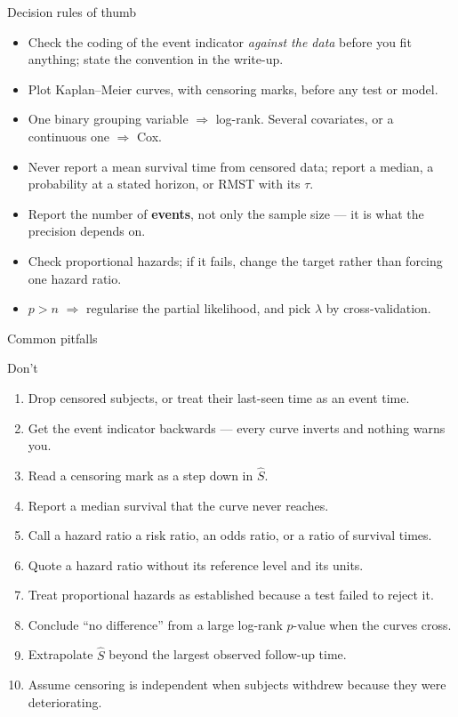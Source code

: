 \documentclass[aspectratio=169,11pt]{beamer}
\begin{document}
\begin{frame}{Decision rules of thumb}
  \begin{itemize}
    \item Check the coding of the event indicator \emph{against the data} before you
          fit anything; state the convention in the write-up.
    \item Plot Kaplan--Meier curves, with censoring marks, before any test or model.
    \item One binary grouping variable $\Rightarrow$ log-rank. Several covariates, or
          a continuous one $\Rightarrow$ Cox.
    \item Never report a mean survival time from censored data; report a median, a
          probability at a stated horizon, or RMST with its $\tau$.
    \item Report the number of \textbf{events}, not only the sample size --- it is what
          the precision depends on.
    \item Check proportional hazards; if it fails, change the target rather than
          forcing one hazard ratio.
    \item $p>n$ $\Rightarrow$ regularise the partial likelihood, and pick $\lambda$ by
          cross-validation.
  \end{itemize}
\end{frame}

\begin{frame}{Common pitfalls}
  \begin{alertblock}{Don't}
    \begin{enumerate}
      \item Drop censored subjects, or treat their last-seen time as an event time.
      \item Get the event indicator backwards --- every curve inverts and nothing warns you.
      \item Read a censoring mark as a step down in $\hat S$.
      \item Report a median survival that the curve never reaches.
      \item Call a hazard ratio a risk ratio, an odds ratio, or a ratio of survival times.
      \item Quote a hazard ratio without its reference level and its units.
      \item Treat proportional hazards as established because a test failed to reject it.
      \item Conclude ``no difference'' from a large log-rank $p$-value when the curves cross.
      \item Extrapolate $\hat S$ beyond the largest observed follow-up time.
      \item Assume censoring is independent when subjects withdrew because they were
            deteriorating.
    \end{enumerate}
  \end{alertblock}
\end{frame}
\end{document}

